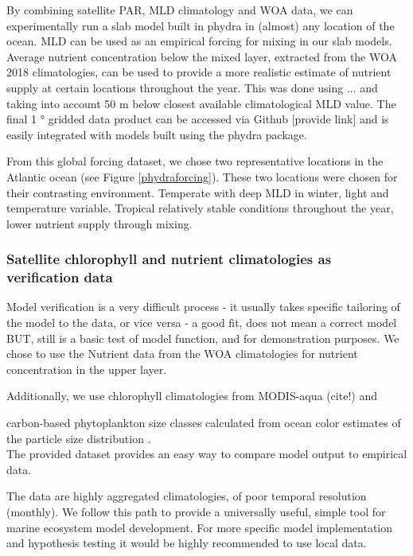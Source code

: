 \documentclass[journal abbreviation, manuscript]{copernicus}
\begin{document}
By combining satellite PAR, MLD climatology and WOA data, we can experimentally run a slab model built in phydra in (almost) any location of the ocean. MLD can be used as an empirical forcing for mixing in our slab models. Average nutrient concentration below the mixed layer, extracted from the WOA 2018 climatologies, can be used to provide a more realistic estimate of nutrient supply at certain locations throughout the year. This was done using ... and taking into account 50 \unit{m} below closest available climatological MLD value. The final 1 \unit{°} gridded data product can be accessed via Github [provide link] and is easily integrated with models built using the phydra package. 

From this global forcing dataset, we chose two representative locations in the Atlantic ocean (see Figure \ref{phydraforcing}). These two locations were chosen for their contrasting environment. Temperate with deep MLD in winter, light and temperature variable. Tropical relatively stable conditions throughout the year, lower nutrient supply through mixing. \\


\subsubsection{Satellite chlorophyll and nutrient climatologies as verification data}
Model verification is a very difficult process
- it usually takes specific tailoring of the model to the data, or vice versa \cite{Schartau2017}
- a good fit, does not mean a correct model \cite{RykielJr1996}\\

BUT, still is a basic test of model function, and for demonstration purposes.
We chose to use the Nutrient data from the WOA climatologies for nutrient concentration in the upper layer.

Additionally, we use chlorophyll climatologies from MODIS-aqua (cite!) and 

carbon-based phytoplankton size classes calculated from ocean color estimates of the particle size distribution \cite{Kostadinov2016Carbon-basedDistribution}.\\

The provided dataset provides an easy way to compare model output to empirical data. 

The data are highly aggregated climatologies, of poor temporal resolution (monthly). We follow this path to provide a universally useful, simple tool for marine ecosystem model development. For more specific model implementation and hypothesis testing it would be highly recommended to use local data.\\
\end{document}

